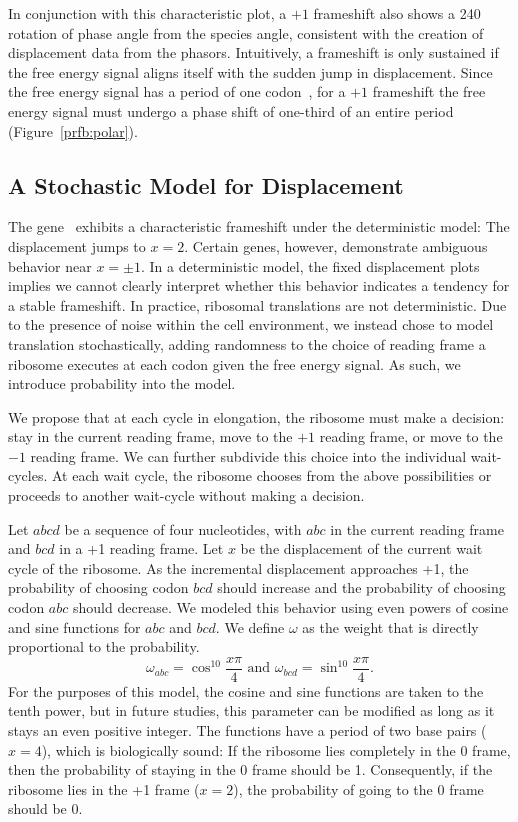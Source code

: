 \documentclass[12pt, draft]{article}
\numberwithin{equation}{section}
\begin{document}
In conjunction with this characteristic plot, a $+1$ frameshift also shows a 240\degree
rotation of phase angle from the species angle, consistent with the creation of displacement data from the phasors.
Intuitively, a frameshift is only sustained if the free energy signal aligns itself with the sudden jump in displacement.
Since the free energy signal has a period of one codon~\cite{lalit:mechanics}, for a $+1$ frameshift the free energy signal
must undergo a phase shift of one-third of an entire period (Figure~\ref{prfb:polar}).

\subsection{A Stochastic Model for Displacement}


The gene \prfB\ exhibits a characteristic frameshift under the deterministic model: The displacement jumps to $x=2$.
Certain genes, however, demonstrate ambiguous behavior near $x = \pm 1$.
In a deterministic model, the fixed displacement plots implies
we cannot clearly interpret whether this behavior indicates a tendency for a stable frameshift.
In practice, ribosomal translations are not deterministic. Due to the presence of
noise within the cell environment, we instead chose to model translation stochastically, adding
randomness to the choice of reading frame a ribosome executes at each codon given the free energy signal.
As such, we introduce probability into the model.

We propose that at each cycle in elongation, the ribosome must make a decision: stay in the current reading frame,
move to the $+1$ reading frame,
or move to the $-1$ reading frame.  We can further subdivide this choice into the individual wait-cycles.
At each wait cycle, the ribosome chooses from the above possibilities or proceeds to another wait-cycle without making a decision.

Let $abcd$ be a sequence of four nucleotides, with $abc$ in the
current reading frame and $bcd$ in a +1 reading frame.  Let $x$ be the
displacement of the current wait cycle of the ribosome.  As the
incremental displacement approaches +1, the probability of choosing
codon $bcd$ should increase and the probability of choosing codon
$abc$ should decrease.  We modeled this behavior using even powers of
cosine and sine functions for $abc$ and $bcd$.  We
define $\omega$ as the weight that is directly proportional to
the probability.
\begin{equation}
  \omega_{abc} = \cos^{10}{\frac{x\pi}{4}} \text{ and } \omega_{bcd} = \sin^{10}{\frac{x\pi}{4}}.
\end{equation}
For the purposes of this model, the cosine and sine functions are taken to the tenth power, but
in future studies, this parameter can be modified as long as it stays an even positive integer.
The functions have a period of two base pairs ($x=4$), which is biologically sound:
If the ribosome lies completely in the 0 frame, then the probability of staying in the 0 frame should be 1.  
Consequently, if the ribosome lies in the +1 frame ($x=2$), the probability of going to
the 0 frame should be 0.
\end{document}
